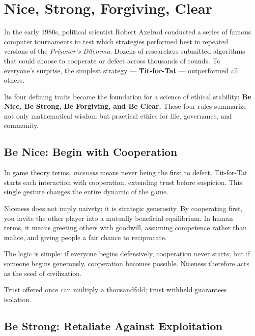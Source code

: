 \documentclass[12pt,twoside]{book}
\begin{document}
\section{Nice, Strong, Forgiving, Clear}

In the early 1980s, political scientist Robert Axelrod conducted a series of famous computer tournaments to test which strategies performed best in repeated versions of the \emph{Prisoner’s Dilemma}.  
Dozens of researchers submitted algorithms that could choose to cooperate or defect across thousands of rounds.  
To everyone’s surprise, the simplest strategy --- \textbf{Tit-for-Tat} --- outperformed all others.  

Its four defining traits became the foundation for a science of ethical stability:  
\textbf{Be Nice, Be Strong, Be Forgiving, and Be Clear.}  
These four rules summarize not only mathematical wisdom but practical ethics for life, governance, and community.

\subsection*{Be Nice: Begin with Cooperation}

In game theory terms, \emph{niceness} means never being the first to defect.  
Tit-for-Tat starts each interaction with cooperation, extending trust before suspicion.  
This single gesture changes the entire dynamic of the game.  

Niceness does not imply naivety; it is strategic generosity.  
By cooperating first, you invite the other player into a mutually beneficial equilibrium.  
In human terms, it means greeting others with goodwill, assuming competence rather than malice, and giving people a fair chance to reciprocate.  

The logic is simple: if everyone begins defensively, cooperation never starts; but if someone begins generously, cooperation becomes possible.  
Niceness therefore acts as the seed of civilization.\\

\begin{keyidea}
Trust offered once can multiply a thousandfold; trust withheld guarantees isolation.
\end{keyidea}

\subsection*{Be Strong: Retaliate Against Exploitation}
\end{document}
